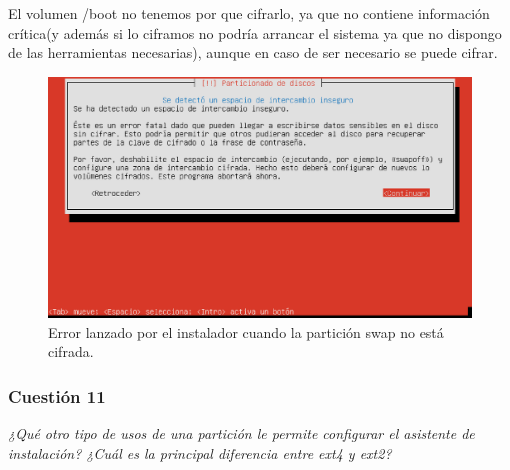 El volumen /boot no tenemos por que cifrarlo, ya que no contiene información crítica(y además si lo ciframos no podría arrancar el sistema ya que no dispongo de las herramientas necesarias), aunque en caso de ser necesario se puede cifrar. \cite{boot}

\begin{figure}[H]
    \begin{center}
        \includegraphics[scale=0.4]{Imagenes/swap_sin_cifrar.eps}
        \caption{Error lanzado por el instalador cuando la partición swap no está cifrada.}
        \label{fig1}
    \end{center}
\end{figure}

\subsubsection{Cuestión 11}
\textit{¿Qué otro tipo de usos de una partición le permite configurar el asistente de instalación? ¿Cuál es la principal diferencia entre ext4 y ext2?} \newline

